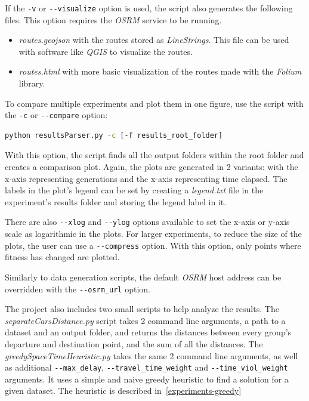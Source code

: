 If the \texttt{-v} or \texttt{-{}-visualize} option is used, the script also generates the following files. This option requires the \textit{OSRM} service to be running.

\begin{itemize}
    \setlength\itemsep{0pt}
    \item \textit{routes.geojson} with the routes stored as \textit{LineStrings}. This file can be used with software like \textit{QGIS} to visualize the routes.
    \item \textit{routes.html} with more basic visualization of the routes made with the \textit{Folium} library.
\end{itemize}

To compare multiple experiments and plot them in one figure, use the script with the \texttt{-c} or \texttt{-{}-compare} option:

\begin{lstlisting}[language=bash]
    python resultsParser.py -c [-f results_root_folder] 
\end{lstlisting}

With this option, the script finds all the output folders within the root folder and creates a comparison plot. Again, the plots are generated in 2 variants: with the x-axis representing generations and the x-axis representing time elapsed. The labels in the plot's legend can be set by creating a \textit{legend.txt} file in the experiment's results folder and storing the legend label in it.

There are also \texttt{-{}-xlog} and \texttt{-{}-ylog} options available to set the x-axis or y-axis scale as logarithmic in the plots. For larger experiments, to reduce the size of the plots, the user can use a \texttt{-{}-compress} option. With this option, only points where fitness has changed are plotted.

Similarly to data generation scripts, the default \textit{OSRM} host address can be overridden with the \texttt{-{}-osrm\_url} option.

The project also includes two small scripts to help analyze the results. The \textit{separateCarsDistance.py} script takes 2 command line arguments, a path to a dataset and an output folder, and returns the distances between every group's departure and destination point, and the sum of all the distances. The \textit{greedySpaceTimeHeuristic.py} takes the same 2 command line arguments, as well as additional \texttt{-{}-max\_delay}, \texttt{-{}-travel\_time\_weight} and \texttt{-{}-time\_viol\_weight} arguments. It uses a simple and naive greedy heuristic to find a solution for a given dataset. The heuristic is described in~\ref{experiments-greedy}



